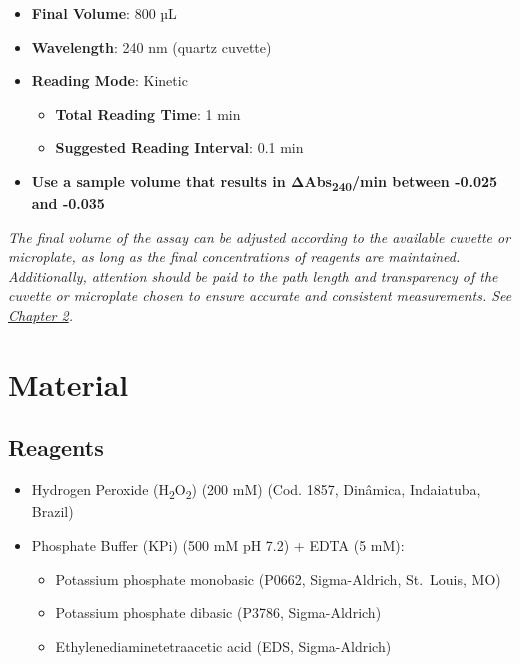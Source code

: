 \documentclass[
  9pt,
  american,
  a5paper,
  extrafontsizes,onecolumn,openright
  ]{memoir}
\providecommand{\tightlist}{%
  \setlength{\itemsep}{0pt}\setlength{\parskip}{0pt}}
\begin{document}
\begin{itemize}
\tightlist
\item
  \textbf{Final Volume}: 800 µL
\item
  \textbf{Wavelength}: 240 nm (quartz cuvette)
\item
  \textbf{Reading Mode}: Kinetic

  \begin{itemize}
  \tightlist
  \item
    \textbf{Total Reading Time}: 1 min
  \item
    \textbf{Suggested Reading Interval}: 0.1 min
  \end{itemize}
\item
  \textbf{Use a sample volume that results in ΔAbs\textsubscript{240}/min between -0.025 and -0.035}
\end{itemize}

\begin{greybox}[frametitle = Note]
\emph{The final volume of the assay can be adjusted according to the available cuvette or microplate, as long as the final concentrations of reagents are maintained. Additionally, attention should be paid to the path length and transparency of the cuvette or microplate chosen to ensure accurate and consistent measurements. See \hyperref[chapter2]{Chapter 2}.}

\end{greybox}

\newpage

\section{Material}\label{cat_detailed_protocol}

\subsection{Reagents}\label{reagents}

\begin{itemize}
\tightlist
\item
  Hydrogen Peroxide (H\textsubscript{2}O\textsubscript{2}) (200 mM) (Cod. 1857, Dinâmica, Indaiatuba, Brazil)
\item
  Phosphate Buffer (KPi) (500 mM pH 7.2) + EDTA (5 mM):

  \begin{itemize}
  \tightlist
  \item
    Potassium phosphate monobasic (P0662, Sigma-Aldrich, St.~Louis, MO)
  \item
    Potassium phosphate dibasic (P3786, Sigma-Aldrich)
  \item
    Ethylenediaminetetraacetic acid (EDS, Sigma-Aldrich)
  \end{itemize}
\end{itemize}
\end{document}
